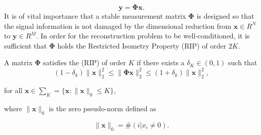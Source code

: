 %
\begin{equation}
  \label{eq:ch4_BIG}
\boldsymbol{y} =\boldsymbol{\Phi x}.
\end{equation}
It is of vital importance that a stable measurement matrix $\boldsymbol{\Phi}$ is designed so that the signal information is not damaged by the dimensional reduction from $\boldsymbol{x} \in R^N$ to $\boldsymbol{y} \in R^M$. In order for the reconstruction problem to be well-conditioned, it is sufficient that ${\boldsymbol{\Phi}}$ holds the Restricted Isometry Property (RIP) \citep{Donoho2006} of order $2K$. 

\begin{mydef}
 A matrix $\boldsymbol{\Phi}$ satisfies the (RIP) of order $K$ if there exists a $\delta_K  \in (0,1)$ such that 
\begin{equation*}
  \label{eq:401}
  (1 - \delta_k)\|\boldsymbol{x}\|^2_2 \leq\|\boldsymbol{\Phi} \boldsymbol{x}\|^2_2 \leq (1 + \delta_k)\|\boldsymbol{x}\|^2_2,
\end{equation*}

for all $\boldsymbol{x} \in \sum_K = \{\boldsymbol{x}:\|\boldsymbol{x}\|_0 \leq K\} $, \newline

where $\|\boldsymbol{x}\|_0$ is the zero pseudo-norm defined as

\begin{equation*}
\|\boldsymbol{x}\|_0 = \#(i|x_i \neq 0). 
\end{equation*}
 
\end{mydef}

%

